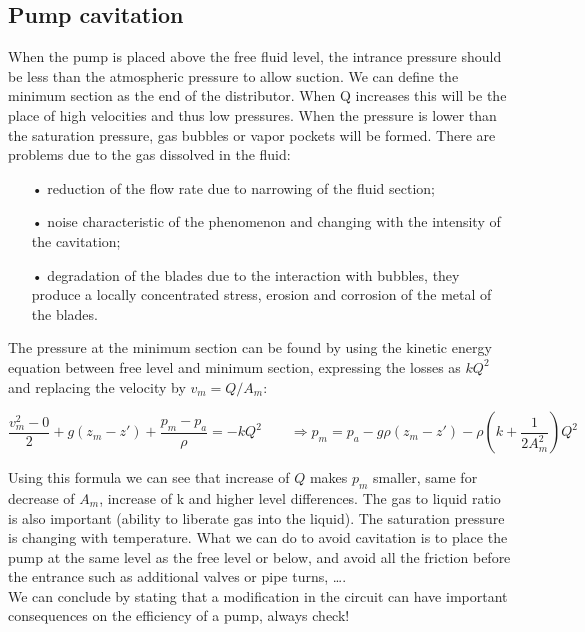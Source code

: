 \subsection{Pump cavitation}
When the pump is placed above the free fluid level, the intrance pressure should be less than the atmospheric pressure to allow suction. We can define the minimum section as the end of the distributor. When Q increases this will be the place of high velocities and thus low pressures. When the pressure is lower than the saturation pressure, gas bubbles or vapor pockets will be formed. There are problems due to the gas dissolved in the fluid: \\

\begin{itemize}
\item[•] reduction of the flow rate due to narrowing of the fluid section;
\item[•] noise characteristic of the phenomenon and changing with the intensity of the cavitation; 
\item[•] degradation of the blades due to the interaction with bubbles, they produce a locally concentrated stress, erosion and corrosion of the metal of the blades. \\
\end{itemize}

The pressure at the minimum section can be found by using the kinetic energy equation between free level and minimum section, expressing the losses as $kQ^2$ and replacing the velocity by $v_m = Q/A_m$: 

\begin{equation}
\frac{v_m^2 - 0}{2} + g(z_m - z') + \frac{p_m - p_a}{\rho} = - kQ^2 \qquad \Rightarrow p_m = p_a - g\rho (z_m - z') -\rho \left( k +\frac{1}{2A_m^2} \right) Q^2
\end{equation}

Using this formula we can see that increase of $Q$ makes $p_m$ smaller, same for decrease of $A_m$, increase of k and higher level differences. The gas to liquid ratio is also important (ability to liberate gas into the liquid). The saturation pressure is changing with temperature. What we can do to avoid cavitation is to place the pump at the same level as the free level or below, and avoid all the friction before the entrance such as additional valves or pipe turns, \dots . \\

We can conclude by stating that a modification in the circuit can have important consequences on the efficiency of a pump, always check!

